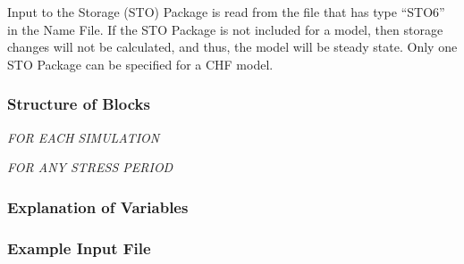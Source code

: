 Input to the Storage (STO) Package is read from the file that has type ``STO6'' in the Name File.  If the STO Package is not included for a model, then storage changes will not be calculated, and thus, the model will be steady state.  Only one STO Package can be specified for a CHF model.

\vspace{5mm}
\subsubsection{Structure of Blocks}

\vspace{5mm}
\noindent \textit{FOR EACH SIMULATION}

\vspace{5mm}
\noindent \textit{FOR ANY STRESS PERIOD}


\vspace{5mm}
\subsubsection{Explanation of Variables}
\begin{description}

\end{description}

\vspace{5mm}
\subsubsection{Example Input File}


